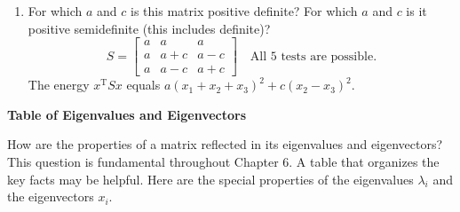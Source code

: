 \documentclass[14pt, a4paper]{article}
\begin{document}
\begin{enumerate}[resume]
    \item For which $a$ and $c$ is this matrix positive definite? For which $a$ and $c$ is it positive semidefinite (this includes definite)?
          \[
              S = \begin{bmatrix} a & a & a \\ a & a + c & a - c \\ a & a - c & a + c \end{bmatrix} \quad \text{All 5 tests are possible.}
          \]
          The energy $x^{\mathrm{T}}Sx$ equals $a(x_1 + x_2 + x_3)^2 + c(x_2 - x_3)^2$.
\end{enumerate}

\newpage
\begin{flushright}
    \textbf{\Large \color{blue!80!black} Table of Eigenvalues and Eigenvectors}
\end{flushright}

\noindent How are the properties of a matrix reflected in its eigenvalues and eigenvectors? This question is fundamental throughout Chapter 6. A table that organizes the key facts may be helpful. Here are the special properties of the eigenvalues $\lambda_i$ and the eigenvectors $x_i$.

\vspace{0.5cm}
\end{document}
